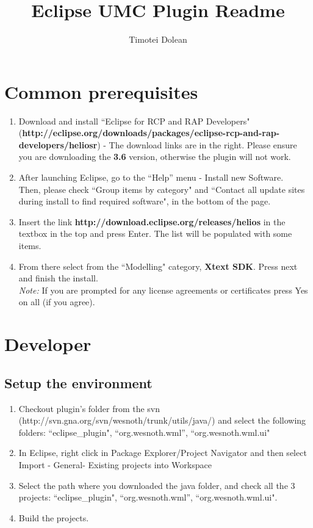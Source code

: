 \documentclass[10pt]{article}
\title{Eclipse UMC Plugin Readme}
\author{Timotei Dolean}
\begin{document}
\maketitle

\newcommand{\icnt}{ \stepcounter{cnt} \thecnt }

\section{Common prerequisites}
\begin{enumerate}
\item Download and install ``Eclipse for RCP and RAP Developers" (\textbf{http://eclipse.org/downloads/packages/eclipse-rcp-and-rap-developers/heliosr}) -
The download links are in the right. Please ensure you are downloading the \textbf{3.6} version,
otherwise the plugin will not work.
\item After launching Eclipse, go to the ``Help'' menu - Install new Software. \\
  Then, please check ``Group items by category" and ``Contact all update sites during install to find required software",
  in the bottom of the page.
\item Insert the link \textbf{http://download.eclipse.org/releases/helios} in the textbox in the top and press Enter.
  The list will be populated with some items.
\item From there select from the ``Modelling" category, \textbf{Xtext SDK}.
  Press next and finish the install.\\
  \textit{Note:} If you are prompted for any license agreements or certificates press Yes on all (if you agree).
\end{enumerate}

\section{Developer}
\subsection{Setup the environment}
\begin{enumerate}
\item Checkout plugin's folder from the svn (http://svn.gna.org/svn/wesnoth/trunk/utils/java/) and select the following folders: ``eclipse\_plugin", ``org.wesnoth.wml'', ``org.wesnoth.wml.ui"
\item In Eclipse, right click in Package Explorer/Project Navigator and then select
  Import - General- Existing projects into Workspace
\item Select the path where you downloaded the java folder, and check all the 3 projects: ``eclipse\_plugin", ``org.wesnoth.wml'', ``org.wesnoth.wml.ui".
\item Build the projects.
\end{enumerate}
\end{document}
